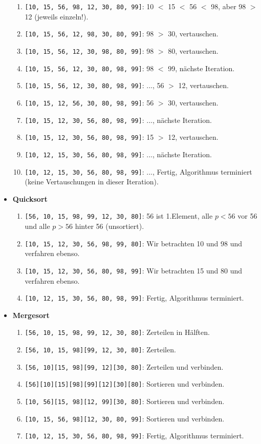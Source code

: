 \documentclass[11pt,a4paper]{scrartcl}
\begin{document}
\begin{itemize}
\begin{enumerate}
\item \texttt{[10, 15, 56, 98, 12, 30, 80, 99]}: 10 $<$ 15 $<$ 56 $<$ 98, aber 98 $>$ 12 (jeweils einzeln!).
\item \texttt{[10, 15, 56, 12, 98, 30, 80, 99]}: 98 $>$ 30, vertauschen.
\item \texttt{[10, 15, 56, 12, 30, 98, 80, 99]}: 98 $>$ 80, vertauschen.
\item \texttt{[10, 15, 56, 12, 30, 80, 98, 99]}: 98 $<$ 99, nächste Iteration.
\item \texttt{[10, 15, 56, 12, 30, 80, 98, 99]}: ..., 56 $>$ 12, vertauschen.
\item \texttt{[10, 15, 12, 56, 30, 80, 98, 99]}: 56 $>$ 30, vertauschen.
\item \texttt{[10, 15, 12, 30, 56, 80, 98, 99]}: ..., nächste Iteration.
\item \texttt{[10, 15, 12, 30, 56, 80, 98, 99]}: 15 $>$ 12, vertauschen.
\item \texttt{[10, 12, 15, 30, 56, 80, 98, 99]}: ..., nächste Iteration.
\item \texttt{[10, 12, 15, 30, 56, 80, 98, 99]}: ..., Fertig, Algorithmus terminiert (keine Vertauschungen in dieser Iteration).
\end{enumerate}
\item \textbf{Quicksort}
\begin{enumerate}
\item \texttt{[56, 10, 15, 98, 99, 12, 30, 80]}: 56 ist 1.Element, alle $p < 56$ vor 56 und alle $p > 56$ hinter 56 (unsortiert).
\item \texttt{[10, 15, 12, 30, 56, 98, 99, 80]}: Wir betrachten 10 und 98 und verfahren ebenso.
\item \texttt{[10, 15, 12, 30, 56, 80, 98, 99]}: Wir betrachten 15 und 80 und verfahren ebenso.
\item \texttt{[10, 12, 15, 30, 56, 80, 98, 99]}: Fertig, Algorithmus terminiert.
\end{enumerate}
\item \textbf{Mergesort}
\begin{enumerate}
\item \texttt{[56, 10, 15, 98, 99, 12, 30, 80]}: Zerteilen in Hälften.
\item \texttt{[56, 10, 15, 98][99, 12, 30, 80]}: Zerteilen.
\item \texttt{[56, 10][15, 98][99, 12][30, 80]}: Zerteilen und verbinden.
\item \texttt{[56][10][15][98][99][12][30][80]}: Sortieren und verbinden.
\item \texttt{[10, 56][15, 98][12, 99][30, 80]}: Sortieren und verbinden.
\item \texttt{[10, 15, 56, 98][12, 30, 80, 99]}: Sortieren und verbinden.
\item \texttt{[10, 12, 15, 30, 56, 80, 98, 99]}: Fertig, Algorithmus terminiert.
\end{enumerate}
\end{itemize}
\end{document}
